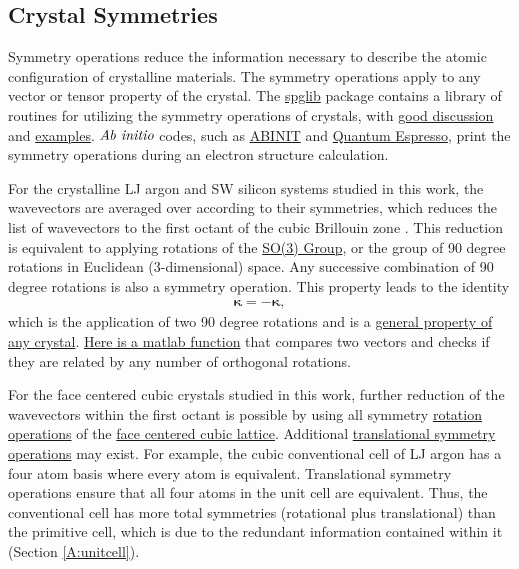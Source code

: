 
\subsection{\label{A:symmetry}Crystal Symmetries}

Symmetry operations reduce the information necessary to describe 
the atomic configuration of crystalline materials. The symmetry 
operations apply to any vector or tensor property of the crystal.
\cite{ashcroft_solid_1976} The 
\href{http://spglib.sourceforge.net/}{spglib} 
package contains a library of routines for utilizing the 
symmetry operations of crystals, with 
\href{http://spglib.sourceforge.net/#definition-of-symmetry-operation}
{good discussion} and 
\href{http://spglib.sourceforge.net/#example}{examples}. 
$\emph{Ab initio}$ codes, such as 
\href{http://www.abinit.org/}{ABINIT} and 
\href{http://www.quantum-espresso.org/}{Quantum Espresso}, print the 
symmetry operations during an electron structure 
calculation. 

For the crystalline LJ argon and SW silicon 
systems studied in this work, 
the wavevectors are averaged over according to their symmetries,   
which reduces the list of wavevectors to the first octant of the 
cubic Brillouin zone \cite{mcgaughey_phonon_2004}. This reduction is equivalent 
to applying rotations of the 
\href{http://en.wikipedia.org/wiki/Rotation_group_SO(3)}
{SO(3) Group}, or the group of 90 degree rotations in Euclidean 
(3-dimensional) space. 
Any successive combination of 90 degree rotations is also a symmetry 
operation. This property leads to the identity
\begin{equation}\label{EQ:kpt_sym}
 \begin{split}
  \pmb{\kappa} = -\pmb{\kappa},
 \end{split}
\end{equation}
which is the application of two 90 degree rotations and is a 
\href{http://en.wikipedia.org/wiki/Parity_(physics)#Odd}
{general property of any crystal}. 
\href{https://github.com/jasonlarkin/disorder/blob/master/matlab/issym.m}
{Here is a matlab function} that compares two vectors 
and checks if they are related by any number of orthogonal 
rotations.

For the face centered cubic crystals studied in this work, 
further reduction of the wavevectors within the first octant 
is possible by using all symmetry 
\href{http://spglib.sourceforge.net/#rotation}{rotation operations} 
of the 
\href{http://www.wolframalpha.com/input/?i=face-centered+cubic}
{face centered cubic lattice}. Additional 
\href{http://en.wikipedia.org/wiki/Translational_symmetry}
{translational symmetry operations} may exist. 
For example, the cubic conventional cell of LJ argon has a four atom 
basis where every atom is equivalent. Translational 
symmetry operations ensure that all four atoms in the unit cell are 
equivalent. Thus, the conventional cell has more total 
symmetries (rotational plus translational) than the primitive cell, 
which is due to the redundant information contained within it 
(Section \ref{A:unitcell}). 
 

